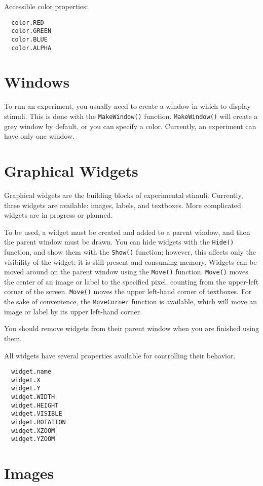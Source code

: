 Accessible color properties:
\begin{verbatim}
  color.RED
  color.GREEN
  color.BLUE
  color.ALPHA
\end{verbatim}
 

\section{Windows}

To run an experiment, you usually need to create a window in which 
to display stimuli.  This is done with the \texttt{MakeWindow()} function. \texttt{MakeWindow()} will create a grey window by default, or you can 
specify a color.  Currently, an experiment can have only one window.


\section{Graphical Widgets}

Graphical widgets are the building blocks of experimental stimuli. 
Currently, three widgets are available: images, labels, and textboxes.  
More complicated widgets are in progress or planned.

To be used, a widget must be created and added to a parent window, and
then the parent window must be drawn.  You can hide widgets with the
\texttt{Hide()} function, and show them with the \texttt{Show()}
function; however, this affects only the visibility of the widget: it
is still present and consuming memory. Widgets can be moved around on
the parent window using the \texttt{Move()} function. \texttt{Move()}
moves the center of an image or label to the specified pixel, counting
from the upper-left corner of the screen. \texttt{Move()} moves the
upper left-hand corner of textboxes.  For the sake of convenience, the
\texttt{MoveCorner} function is available, which will move an image or
label by its upper left-hand corner.

You should remove widgets from their parent window when you are
finished using them.

All widgets have several properties available for controlling their
behavior.
\begin{verbatim}
  widget.name
  widget.X
  widget.Y
  widget.WIDTH
  widget.HEIGHT
  widget.VISIBLE
  widget.ROTATION
  widget.XZOOM
  widget.YZOOM
\end{verbatim}


  

\section{Images}

